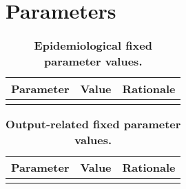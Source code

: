 \documentclass{article}
\begin{document}

\section{Parameters}


\begin{table}
    \begin{tabularx}{\textwidth}{| X | p{2.5cm} | X |}
    \hline
    \textbf{Parameter} & \textbf{Value} & \textbf{Rationale} \\
    \hline
     \\
    \hline
    \end{tabularx}
	\caption{\textbf{Epidemiological fixed parameter values.}}
    \label{tab:fixed_params}
\end{table}

\begin{table}
    \begin{tabularx}{\textwidth}{| X | p{2.5cm} | X |}
    \hline
    \textbf{Parameter} & \textbf{Value} & \textbf{Rationale} \\
    \hline
     \\
    \hline
    \end{tabularx}
	\caption{\textbf{Output-related fixed parameter values.}}
    \label{tab:output_params}
\end{table}

\newpage    
\printbibliography
\end{document}
